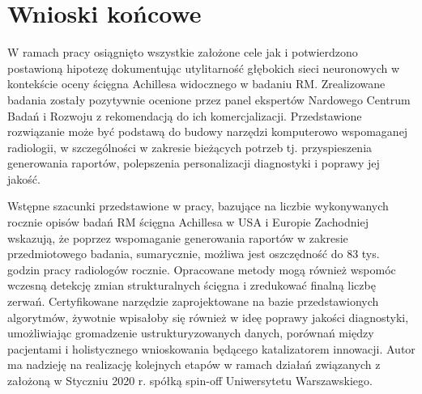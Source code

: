 {\let\clearpage\relax\chapter*{Wnioski końcowe}}

W ramach pracy osiągnięto wszystkie założone cele jak i potwierdzono postawioną hipotezę dokumentując utylitarność głębokich sieci neuronowych w kontekście oceny ścięgna Achillesa widocznego w badaniu RM. Zrealizowane badania zostały pozytywnie ocenione przez panel ekspertów Nardowego Centrum Badań i Rozwoju z rekomendacją do ich komercjalizacji. Przedstawione rozwiązanie może być podstawą do budowy narzędzi komputerowo wspomaganej radiologii, w szczególności w zakresie bieżących potrzeb tj. przyspieszenia generowania raportów, polepszenia personalizacji diagnostyki i poprawy jej jakość.

Wstępne szacunki przedstawione w pracy, bazujące na liczbie wykonywanych rocznie opisów badań RM ścięgna Achillesa w USA i Europie Zachodniej wskazują, że poprzez wspomaganie generowania raportów w zakresie przedmiotowego badania, sumarycznie, możliwa jest oszczędność do 83 tys. godzin pracy radiologów rocznie. Opracowane metody mogą również wspomóc wczesną detekcję zmian strukturalnych ścięgna i zredukować finalną liczbę zerwań. Certyfikowane narzędzie zaprojektowane na bazie przedstawionych algorytmów, żywotnie wpisałoby się również w ideę poprawy jakości diagnostyki, umożliwiając gromadzenie ustrukturyzowanych danych, porównań między pacjentami i holistycznego wnioskowania będącego katalizatorem innowacji. Autor ma nadzieję na realizację kolejnych etapów w ramach działań związanych z założoną w Styczniu 2020 r. spółką spin-off Uniwersytetu Warszawskiego.
